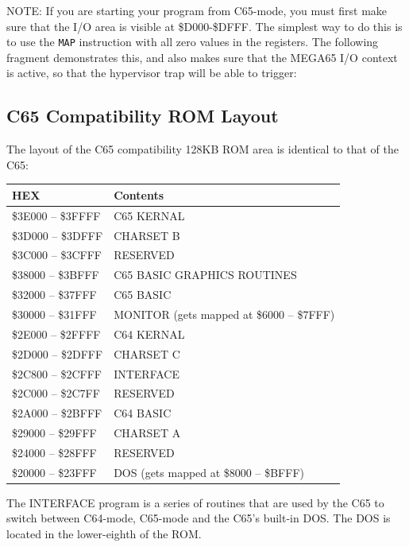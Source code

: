 NOTE: If you are starting your program from C65-mode, you must first make
sure that the I/O area is visible at \$D000-\$DFFF.  The simplest way to do
this is to use the {\tt MAP} instruction with all zero values in the registers.
The following fragment demonstrates this, and also makes sure that the MEGA65 I/O
context is active, so that the hypervisor trap will be able to trigger:



\subsection{C65 Compatibility ROM Layout}

The layout of the C65 compatibility 128KB ROM area is identical to that of the C65:

\begin{center}
  {\ttfamily
  \setlength{\tabcolsep}{3pt}
  \begin{tabular}{|l|l|}
  \hline
  {\bf{HEX}} & {\bf{Contents}} \\
  \hline
  \$3E000 -- \$3FFFF & C65 KERNAL \\
  \hline
  \$3D000 -- \$3DFFF & CHARSET B \\
  \hline
  \$3C000 -- \$3CFFF & RESERVED \\
  \hline
  \$38000 -- \$3BFFF & C65 BASIC GRAPHICS ROUTINES \\
  \hline
  \$32000 -- \$37FFF & C65 BASIC \\
  \hline
  \$30000 -- \$31FFF & MONITOR (gets mapped at \$6000 -- \$7FFF) \\
  \hline
  \$2E000 -- \$2FFFF & C64 KERNAL \\
  \hline
  \$2D000 -- \$2DFFF & CHARSET C \\
  \hline
  \$2C800 -- \$2CFFF & INTERFACE \\
  \hline
  \$2C000 -- \$2C7FF & RESERVED \\
  \hline
  \$2A000 -- \$2BFFF & C64 BASIC \\
  \hline
  \$29000 -- \$29FFF & CHARSET A \\
  \hline
  \$24000 -- \$28FFF & RESERVED \\
  \hline
  \$20000 -- \$23FFF & DOS (gets mapped at \$8000 -- \$BFFF) \\
  \hline
  \end{tabular}
  }
\end{center}

The INTERFACE program is a series of routines that are used by the C65
to switch between C64-mode, C65-mode and the C65's built-in DOS.  The
DOS is located in the lower-eighth of the ROM.




